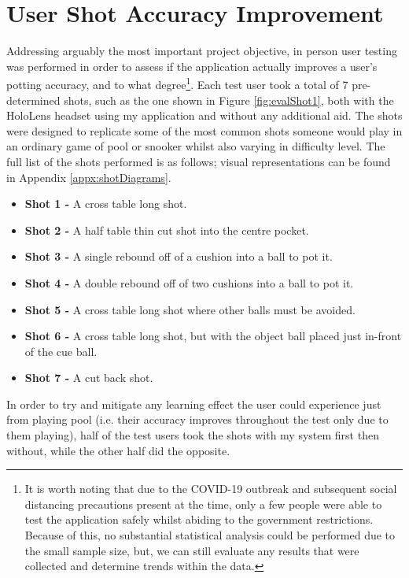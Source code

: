 \documentclass[ %
                author={Finn Alexander Wilkinson},
                supervisor={Dr. Andrew Calway},
                degree={MEng},
                title={\centering A Mixed Reality Aim Assistant for Pool and Snooker},
                subtitle={},
                type={Enterprise},
                year={2021} ]{dissertation}
\begin{document}
\section{User Shot Accuracy Improvement}
\label{eval:accuracyImprovement}
Addressing arguably the most important project objective, in person user testing was performed in order to assess if the application actually improves a user's potting accuracy, and to what degree\footnote{It is worth noting that due to the COVID-19 outbreak and subsequent social distancing precautions present at the time, only a few people were able to test the application safely whilst abiding to the government restrictions. Because of this, no substantial statistical analysis could be performed due to the small sample size, but, we can still evaluate any results that were collected and determine trends within the data.}. Each test user took a total of 7 pre-determined shots, such as the one shown in Figure \ref{fig:evalShot1}, both with the HoloLens headset using my application and without any additional aid. The shots were designed to replicate some of the most common shots someone would play in an ordinary game of pool or snooker whilst also varying in difficulty level. The full list of the shots performed is as follows; visual representations can be found in Appendix \ref{appx:shotDiagrams}.
\begin{itemize}
    \item \textbf{Shot 1 -} A cross table long shot.
    \item \textbf{Shot 2 -} A half table thin cut shot into the centre pocket.
    \item \textbf{Shot 3 -} A single rebound off of a cushion into a ball to pot it.
    \item \textbf{Shot 4 -} A double rebound off of two cushions into a ball to pot it.
    \item \textbf{Shot 5 -} A cross table long shot where other balls must be avoided.
    \item \textbf{Shot 6 -} A cross table long shot, but with the object ball placed just in-front of the cue ball.
    \item \textbf{Shot 7 -} A cut back shot.
\end{itemize}

In order to try and mitigate any learning effect the user could experience just from playing pool (i.e. their accuracy improves throughout the test only due to them playing), half of the test users took the shots with my system first then without, while the other half did the opposite. \\\par
\end{document}
